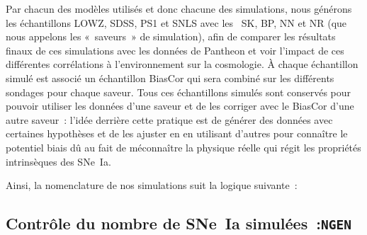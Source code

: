 \documentclass[../main/main.tex]{subfiles}
\begin{document}
Par chacun des modèles utilisés et donc chacune des simulations, nous générons
les échantillons LOWZ, SDSS, PS1 et SNLS avec les \hostlib\ SK, BP, NN et NR
(que nous appelons les «~saveurs~» de simulation), afin de comparer les
résultats finaux de ces simulations avec les données de Pantheon et voir
l'impact de ces différentes corrélations à l'environnement sur la cosmologie. À
chaque échantillon simulé est associé un échantillon BiasCor qui sera combiné
sur les différents sondages pour chaque saveur. Tous ces échantillons simulés
sont conservés pour pouvoir utiliser les données d'une saveur et de les corriger
avec le BiasCor d'une autre saveur~: l'idée derrière cette pratique est de
générer des données avec certaines hypothèses et de les ajuster en en utilisant
d'autres pour connaître le potentiel biais dû au fait de méconnaître la physique
réelle qui régit les propriétés intrinsèques des SNe~Ia.

Ainsi, la nomenclature de nos simulations suit la logique suivante~:
\begin{center}
\end{center}

\subsection{Contrôle du nombre de SNe~Ia simulées~:\texttt{NGEN}}\label{ssec:ngen}
\end{document}
